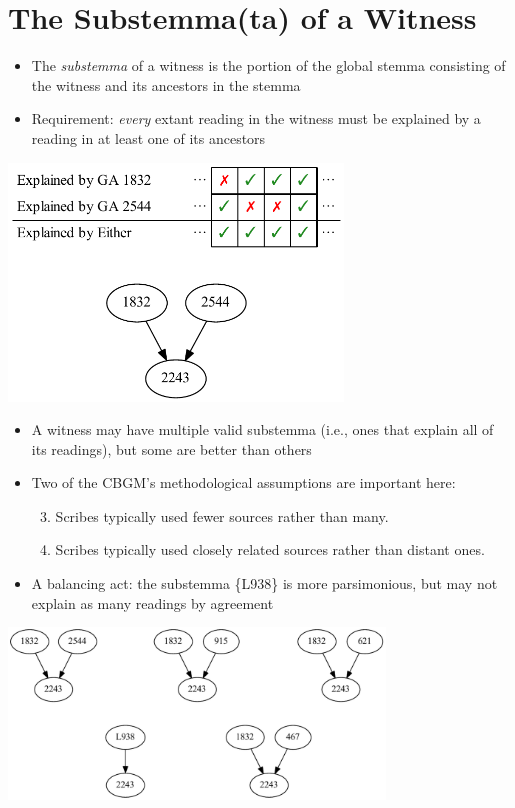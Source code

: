 \documentclass[10pt]{beamer}
\begin{document}
	\section*{The Substemma(ta) of a Witness}
	\begin{frame}
		\begin{itemize}
			\item The \emph{substemma} of a witness is the portion of the global stemma consisting of the witness and its ancestors in the stemma
			\item Requirement: \emph{every} extant reading in the witness must be explained by a reading in at least one of its ancestors
		\end{itemize}
		\begin{center}
			\includegraphics[width=0.6667\textwidth]{../img/ga-2243-substemma.pdf}
		\end{center}
	\end{frame}
	\begin{frame}
		\begin{itemize}
			\item A witness may have multiple valid substemma (i.e., ones that explain all of its readings), but some are better than others
			\item Two of the CBGM's methodological assumptions are important here:
			\begin{enumerate}
				\setcounter{enumi}{2} %
				\item Scribes typically used fewer sources rather than many.
				\item Scribes typically used closely related sources rather than distant ones.
			\end{enumerate}
			\item A balancing act: the substemma \{L938\} is more parsimonious, but may not explain as many readings by agreement
		\end{itemize}
		\begin{center}
			\includegraphics[width=0.75\textwidth]{../img/substemmata.pdf}
		\end{center}
	\end{frame}
\end{document}
